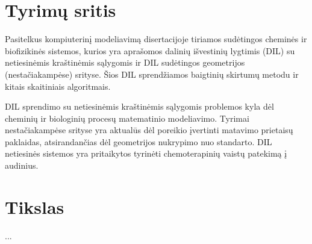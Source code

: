 
\pagestyle{plain}


\section*{Tyrimų sritis}

Pasitelkus kompiuterinį modeliavimą disertacijoje tiriamos su\-dė\-tin\-gos cheminės ir biofizikinės sistemos, kurios yra aprašomos dalinių išvestinių lygtimis (DIL) su netiesinėmis kraštinėmis sąlygomis ir DIL sudėtingos geometrijos (nestačiakampėse) srityse. Šios DIL sprendžiamos baigtinių skirtumų metodu ir kitais skaitiniais algoritmais. 


DIL sprendimo su netiesinėmis kraštinėmis sąlygomis problemos kyla dėl cheminių ir biologinių procesų matematinio modeliavimo. 
Tyrimai nestačiakampėse srityse yra aktualūs dėl poreikio įvertinti matavimo prietaisų paklaidas, atsirandančias dėl geometrijos nukrypimo nuo standarto.
DIL netiesinės sistemos yra pritaikytos tyrinėti chemoterapinių vaistų patekimą į audinius.





\section*{Tikslas}
...





